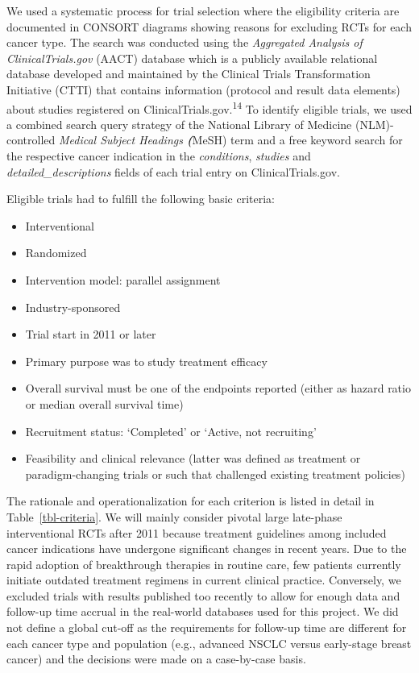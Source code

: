 \documentclass[
  letterpaper,
  DIV=11,
  numbers=noendperiod]{scrartcl}
\begin{document}
We used a systematic process for trial selection where the eligibility
criteria are documented in CONSORT diagrams showing reasons for
excluding RCTs for each cancer type. The search was conducted using the
\emph{Aggregated Analysis of ClinicalTrials.gov} (AACT) database which
is a publicly available relational database developed and maintained by
the Clinical Trials Transformation Initiative (CTTI) that contains
information (protocol and result data elements) about studies registered
on ClinicalTrials.gov.\textsuperscript{14} To identify eligible trials,
we used a combined search query strategy of the National Library of
Medicine (NLM)-controlled \emph{Medical Subject Headings
\textbf{(}}MeSH) term and a free keyword search for the respective
cancer indication in the \emph{conditions}, \emph{studies} and
\emph{detailed\_descriptions} fields of each trial entry on
ClinicalTrials.gov.

Eligible trials had to fulfill the following basic criteria:

\begin{itemize}
\item
  Interventional
\item
  Randomized
\item
  Intervention model: parallel assignment
\item
  Industry-sponsored
\item
  Trial start in 2011 or later
\item
  Primary purpose was to study treatment efficacy
\item
  Overall survival must be one of the endpoints reported (either as
  hazard ratio or median overall survival time)
\item
  Recruitment status: `Completed' or `Active, not recruiting'
\item
  Feasibility and clinical relevance (latter was defined as treatment or
  paradigm-changing trials or such that challenged existing treatment
  policies)
\end{itemize}

The rationale and operationalization for each criterion is listed in
detail in Table~\ref{tbl-criteria}. We will mainly consider pivotal
large late-phase interventional RCTs after 2011 because treatment
guidelines among included cancer indications have undergone significant
changes in recent years. Due to the rapid adoption of breakthrough
therapies in routine care, few patients currently initiate outdated
treatment regimens in current clinical practice. Conversely, we excluded
trials with results published too recently to allow for enough data and
follow-up time accrual in the real-world databases used for this
project. We did not define a global cut-off as the requirements for
follow-up time are different for each cancer type and population (e.g.,
advanced NSCLC versus early-stage breast cancer) and the decisions were
made on a case-by-case basis.
\end{document}

